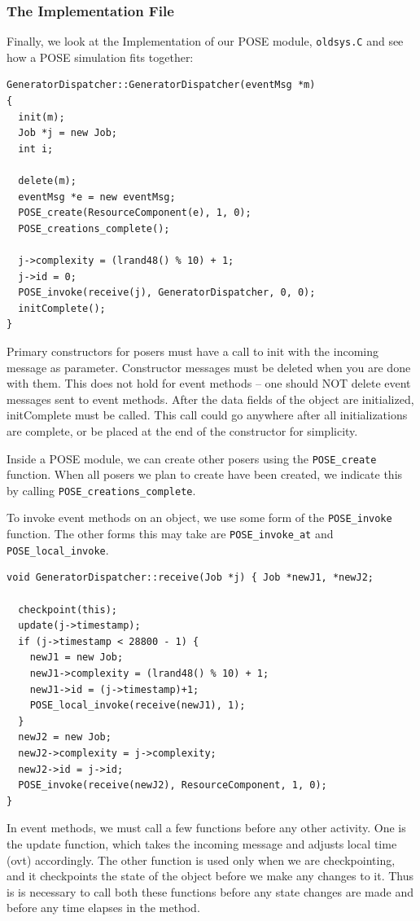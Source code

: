 \documentclass[10pt]{article}
\begin{document}
\subsubsection{The Implementation File}

Finally, we look at the Implementation of our POSE module,
{\tt oldsys.C} and see how a POSE simulation fits together: 

\begin{verbatim}
GeneratorDispatcher::GeneratorDispatcher(eventMsg *m)
{
  init(m);
  Job *j = new Job;
  int i;

  delete(m);
  eventMsg *e = new eventMsg;
  POSE_create(ResourceComponent(e), 1, 0);
  POSE_creations_complete();

  j->complexity = (lrand48() % 10) + 1;
  j->id = 0;
  POSE_invoke(receive(j), GeneratorDispatcher, 0, 0);
  initComplete();
}
\end{verbatim}

Primary constructors for posers must have a call to init with the incoming
message as parameter.  Constructor messages must be deleted when you are done
with them.  This does not hold for event methods -- one should NOT delete
event messages sent to event methods.  After the data fields of the object are
initialized, initComplete must be called.  This call could go anywhere after
all initializations are complete, or be placed at the end of the constructor
for simplicity. 

Inside a POSE module, we can create other posers using the \verb|POSE_create|
function.  When all posers we plan to create have been created, we indicate
this by calling \verb|POSE_creations_complete|.

To invoke event methods on an object, we use some form of the
\verb|POSE_invoke| function.  The other forms this may take are
\verb|POSE_invoke_at| and
\verb|POSE_local_invoke|.  

\begin{verbatim}
void GeneratorDispatcher::receive(Job *j) { Job *newJ1, *newJ2;

  checkpoint(this);
  update(j->timestamp);
  if (j->timestamp < 28800 - 1) {
    newJ1 = new Job;
    newJ1->complexity = (lrand48() % 10) + 1;
    newJ1->id = (j->timestamp)+1;
    POSE_local_invoke(receive(newJ1), 1);
  }
  newJ2 = new Job;
  newJ2->complexity = j->complexity;
  newJ2->id = j->id;
  POSE_invoke(receive(newJ2), ResourceComponent, 1, 0);
}
\end{verbatim}

In event methods, we must call a few functions before any other activity.  One
is the update function, which takes the incoming message and adjusts local
time (ovt) accordingly.  The other function is used only when we are
checkpointing, and it checkpoints the state of the object before we make any
changes to it.  Thus is is necessary to call both these functions before any
state changes are made and before any time elapses in the method. 
\end{document}
